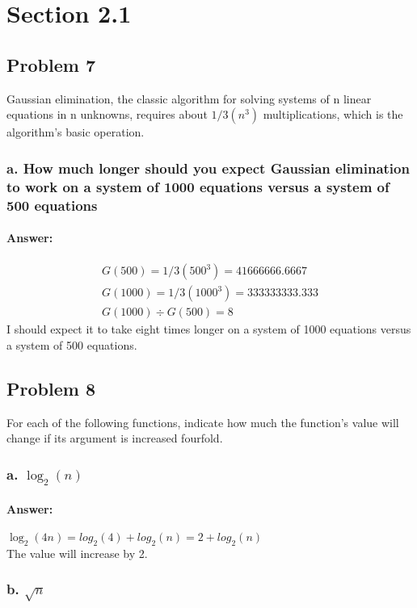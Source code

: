 \documentclass{article}
\begin{document}
\section{Section 2.1}
  \subsection{Problem 7}
         Gaussian elimination, the classic algorithm for solving systems of n linear
         equations in n unknowns, requires about $1/3(n^3)$ multiplications, which is the
         algorithm’s basic operation.
     \subsubsection{a. How much longer should you expect Gaussian elimination to work on a
                    system of 1000 equations versus a system of 500 equations}
        \paragraph{Answer:}
          \begin{align}
            G(500)=1/3(500^3)=41666666.6667 \\
            G(1000)=1/3(1000^3)=333333333.333 \\
            G(1000)\div G(500) = 8
          \end{align}
          I should expect it to take eight times longer on a system of 1000 equations versus a system of 500 equations.


  \subsection{Problem 8}
        For each of the following functions, indicate how much the function’s value
        will change if its argument is increased fourfold.
    \subsubsection{a. $\log_{2}(n)$}
          \paragraph{Answer:}
              $\log_{2}(4n) = log_{2}(4) + log_2(n) = 2 + log_2(n)$ \\
              The value will increase by 2.
    \subsubsection{b. $\sqrt{n}$}
\end{document}
